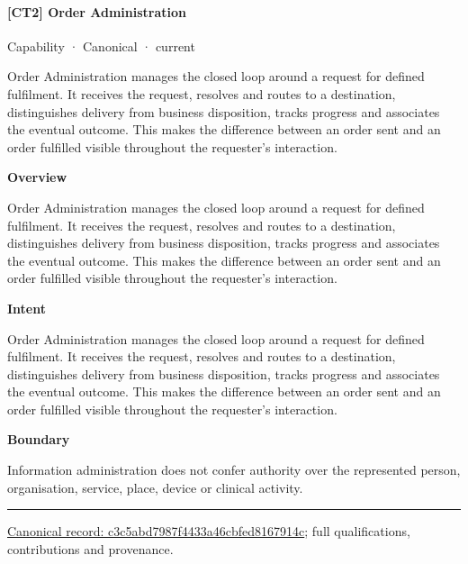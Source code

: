 \paragraph{[CT2] Order Administration}

\label{element:c3c5abd7987f4433a46cbfed8167914c}
{\small Capability · Canonical · current}\par

Order Administration manages the closed loop around a request for defined fulfilment. It receives the request, resolves and routes to a destination, distinguishes delivery from business disposition, tracks progress and associates the eventual outcome. This makes the difference between an order sent and an order fulfilled visible throughout the requester's interaction.



\textbf{Overview}



Order Administration manages the closed loop around a request for defined fulfilment. It receives the request, resolves and routes to a destination, distinguishes delivery from business disposition, tracks progress and associates the eventual outcome. This makes the difference between an order sent and an order fulfilled visible throughout the requester's interaction.



\textbf{Intent}



Order Administration manages the closed loop around a request for defined fulfilment. It receives the request, resolves and routes to a destination, distinguishes delivery from business disposition, tracks progress and associates the eventual outcome. This makes the difference between an order sent and an order fulfilled visible throughout the requester's interaction.



\textbf{Boundary}



Information administration does not confer authority over the represented person, organisation, service, place, device or clinical activity.



\medskip\hrule\medskip

{\footnotesize \href{../../../../continuum/strategy/capability/c3c5abd7987f4433a46cbfed8167914c.md}{Canonical record: c3c5abd7987f4433a46cbfed8167914c}; full qualifications, contributions and provenance.}\par
